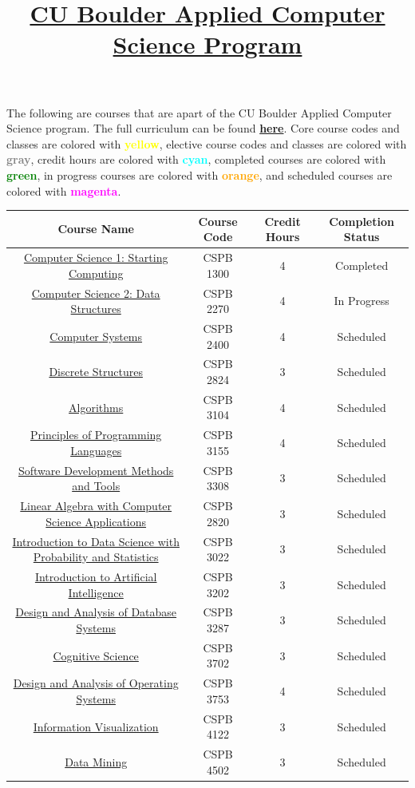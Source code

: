 \documentclass{article}
\title{\href{https://www.colorado.edu/program/cspb/}{\textbf{CU Boulder Applied Computer Science Program}}}
\author{}
\date{}
\newcommand{\coreclass}{\cellcolor{yellow!25}}
\newcommand{\electiveclass}{\cellcolor{gray!25}}
\newcommand{\credithours}{\cellcolor{cyan!25}}
\newcommand{\header}{\cellcolor{gray!25}}
\newcommand{\completed}{\cellcolor{green!25} Completed}
\newcommand{\inprogress}{\cellcolor{orange!25} In Progress}
\newcommand{\scheduled}{\cellcolor{magenta!25} Scheduled}
\newcommand{\CSPBIntro}{\href{https://www.colorado.edu/program/cspb/cspb-1300-computer-science-1-starting-computing}{Computer Science 1: Starting Computing}}
\newcommand{\CSPBDataStruct}{\href{https://www.colorado.edu/program/cspb/cspb-2270-computer-science-2-data-structures}{Computer Science 2: Data Structures}}
\newcommand{\CSPBCompSys}{\href{https://www.colorado.edu/program/cspb/cspb-2400-computer-systems}{Computer Systems}}
\newcommand{\CSPBDisc}{\href{https://www.colorado.edu/program/cspb/cspb-2824-discrete-structures}{Discrete Structures}}
\newcommand{\CSPBAlgo}{\href{https://www.colorado.edu/program/cspb/cspb-3104-algorithms}{Algorithms}}
\newcommand{\CSPBPrincProg}{\href{https://www.colorado.edu/program/cspb/cspb-3155-principles-programming-languages}{Principles of Programming Languages}}
\newcommand{\CSPBSoftDev}{\href{https://www.colorado.edu/program/cspb/cspb-3308-software-development-methods-and-tools}{Software Development Methods and Tools}}
\newcommand{\CSPBLinAlg}{\href{https://www.colorado.edu/program/cspb/cspb-2820-–-linear-algebra-computer-science-applications}{Linear Algebra with Computer Science Applications}}
\newcommand{\CSPBDataSci}{\href{https://www.colorado.edu/program/cspb/cspb-3022-introduction-data-science-probability-and-statistics}{Introduction to Data Science with Probability and Statistics}}
\newcommand{\CSPBArtIntell}{\href{https://www.colorado.edu/program/cspb/cspb-3202-introduction-artificial-intelligence}{Introduction to Artificial Intelligence}}
\newcommand{\CSPBDataBase}{\href{https://www.colorado.edu/program/cspb/cspb-3287-design-and-analysis-database-systems}{Design and Analysis of Database Systems}}
\newcommand{\CSPBCogSci}{\href{https://www.colorado.edu/program/cspb/cspb-3702-cognitive-science}{Cognitive Science}}
\newcommand{\CSPBOpSys}{\href{https://www.colorado.edu/program/cspb/cspb-3753-design-and-analysis-operating-systems}{Design and Analysis of Operating Systems}}
\newcommand{\CSPBInfoVis}{\href{https://www.colorado.edu/program/cspb/cspb-4122-information-visualization}{Information Visualization}}
\newcommand{\CSPBDataMin}{\href{https://www.colorado.edu/program/cspb/cspb-4502-data-mining}{Data Mining}}
\begin{document}
\maketitle
\vspace{-2em}
The following are courses that are apart of the CU Boulder Applied Computer Science program. The full curriculum can be found \href{https://www.colorado.edu/program/cspb/academics/curriculum-course-list}{\textbf{here}}. Core course codes and classes are colored with \textcolor{yellow}{\textbf{yellow}}, elective course codes and classes are colored with \textcolor{gray}{\textbf{gray}}, credit hours are colored with \textcolor{cyan}{\textbf{cyan}}, completed courses are colored with \textcolor{green}{\textbf{green}}, in progress courses are colored with \textcolor{orange}{\textbf{orange}}, and scheduled courses are colored with \textcolor{magenta}{\textbf{magenta}}.
\begin{table}[ht]
\centering
\begin{tabular}{|c|c|c|c|}
    \hline
    \header \textbf{Course Name} & \header \textbf{Course Code} & \header \textbf{Credit Hours} \header & \header \textbf{Completion Status} \\ \hline 
    \coreclass \CSPBIntro & \coreclass CSPB 1300 & \credithours 4 & \completed \\ \hline
    \coreclass \CSPBDataStruct & \coreclass CSPB 2270 & \credithours 4 & \inprogress \\ \hline
    \coreclass \CSPBCompSys & \coreclass CSPB 2400 & \credithours 4 & \scheduled \\ \hline
    \coreclass \CSPBDisc & \coreclass CSPB 2824 & \credithours 3 & \scheduled \\ \hline
    \coreclass \CSPBAlgo & \coreclass CSPB 3104 & \credithours 4 & \scheduled \\ \hline
    \coreclass \CSPBPrincProg & \coreclass CSPB 3155 & \credithours 4 & \scheduled \\ \hline
    \coreclass \CSPBSoftDev & \coreclass CSPB 3308 & \credithours 3 & \scheduled \\ \hline
    \electiveclass \CSPBLinAlg & \electiveclass CSPB 2820 & \credithours 3 & \scheduled \\ \hline
    \electiveclass \CSPBDataSci & \electiveclass CSPB 3022 & \credithours 3 & \scheduled \\ \hline
    \electiveclass \CSPBArtIntell & \electiveclass CSPB 3202 & \credithours 3 & \scheduled \\ \hline
    \electiveclass \CSPBDataBase & \electiveclass CSPB 3287 & \credithours 3 & \scheduled \\ \hline
    \electiveclass \CSPBCogSci & \electiveclass CSPB 3702 & \credithours 3 & \scheduled \\ \hline
    \electiveclass \CSPBOpSys & \electiveclass CSPB 3753 & \credithours 4 & \scheduled \\ \hline
    \electiveclass \CSPBInfoVis & \electiveclass CSPB 4122 & \credithours 3 & \scheduled \\ \hline
    \electiveclass \CSPBDataMin & \electiveclass CSPB 4502 & \credithours 3 & \scheduled \\ \hline    
\end{tabular}
\end{table}
\end{document}

